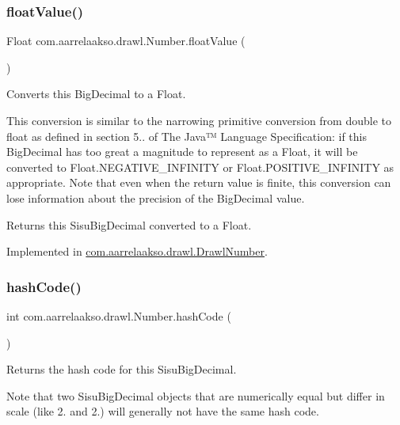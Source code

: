 \subsubsection{\texorpdfstring{float\+Value()}{floatValue()}}
{\footnotesize\ttfamily Float com.\+aarrelaakso.\+drawl.\+Number.\+float\+Value (\begin{DoxyParamCaption}{ }\end{DoxyParamCaption})}



Converts this Big\+Decimal to a Float. 

This conversion is similar to the narrowing primitive conversion from double to float as defined in section 5.. of The Java™ Language Specification\+: if this Big\+Decimal has too great a magnitude to represent as a Float, it will be converted to Float.\+N\+E\+G\+A\+T\+I\+V\+E\+\_\+\+I\+N\+F\+I\+N\+I\+TY or Float.\+P\+O\+S\+I\+T\+I\+V\+E\+\_\+\+I\+N\+F\+I\+N\+I\+TY as appropriate. Note that even when the return value is finite, this conversion can lose information about the precision of the Big\+Decimal value.

\begin{DoxyReturn}{Returns}
this Sisu\+Big\+Decimal converted to a Float. 
\end{DoxyReturn}


Implemented in \hyperlink{classcom_1_1aarrelaakso_1_1drawl_1_1_drawl_number_ae8442cbd5cc7ab0c35c0302b196b3819}{com.\+aarrelaakso.\+drawl.\+Drawl\+Number}.

\mbox{\label{interfacecom_1_1aarrelaakso_1_1drawl_1_1_number_a493e402b6856cded24d43022bd1b816a}} 
\subsubsection{\texorpdfstring{hash\+Code()}{hashCode()}}
{\footnotesize\ttfamily int com.\+aarrelaakso.\+drawl.\+Number.\+hash\+Code (\begin{DoxyParamCaption}{ }\end{DoxyParamCaption})}



Returns the hash code for this Sisu\+Big\+Decimal. 

Note that two Sisu\+Big\+Decimal objects that are numerically equal but differ in scale (like 2. and 2.) will generally not have the same hash code.

